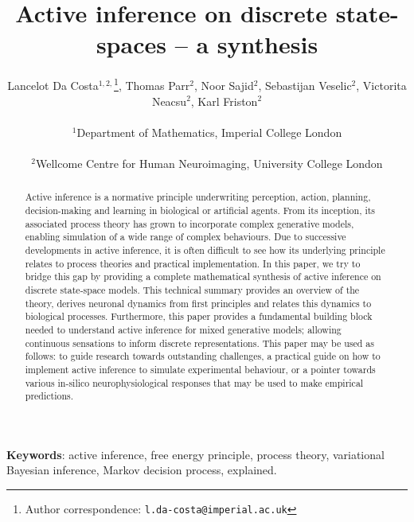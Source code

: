 \documentclass{article}
\title{Active inference on discrete state-spaces -- a synthesis}
\author{Lancelot Da Costa$^{1,2,}$\thanks{Author correspondence: \texttt{l.da-costa@imperial.ac.uk}}\:,\: Thomas Parr$^2$, \:Noor Sajid$^2$, \: Sebastijan Veselic$^2$,\: Victorita Neacsu$^2$,\: Karl Friston$^2$ \\ \\
$^1$Department of Mathematics, Imperial College London \\ \\
$^2$Wellcome Centre for Human Neuroimaging, University College London}
\begin{document}
\maketitle

\begin{abstract}
    Active inference is a normative principle underwriting perception, action, planning, decision-making and learning in biological or artificial agents. From its inception, its associated process theory has grown to incorporate complex generative models, enabling simulation of a wide range of complex behaviours. Due to successive developments in active inference, it is often difficult to see how its underlying principle relates to process theories and practical implementation. In this paper, we try to bridge this gap by providing a complete mathematical synthesis of active inference on discrete state-space models. This technical summary provides an overview of the theory, derives neuronal dynamics from first principles and relates this dynamics to biological processes. Furthermore, this paper provides a fundamental building block needed to understand active inference for mixed generative models; allowing continuous sensations to inform discrete representations. This paper may be used as follows: to guide research towards outstanding challenges, a practical guide on how to implement active inference to simulate experimental behaviour, or a pointer towards various in-silico neurophysiological responses that may be used to make empirical predictions.
\end{abstract}

\textbf{Keywords}: active inference, free energy principle, process theory, variational Bayesian inference, Markov decision process, explained.

\tableofcontents
\end{document}
